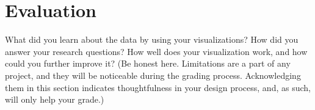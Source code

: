 \documentclass{article}\usepackage{graphicx}
\begin{document}
\section*{Evaluation}
What did you learn about the data by using your visualizations? How did you answer your research questions? How well does your visualization work, and how could you further improve it? (Be honest here. Limitations are a part of any project, and they will be noticeable during the grading process. Acknowledging them in this section indicates thoughtfulness in your design process, and, as such, will only help your grade.)
\end{document}
